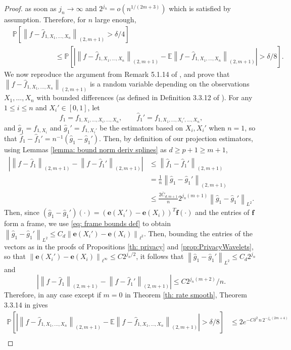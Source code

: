 \documentclass[preprint]{imsart}
\newcommand\norm[1]{\left\lVert#1\right\rVert}
\numberwithin{equation}{section}
\begin{document}
\begin{appendix}
\begin{proof}
as soon as $j_n\to \infty$ and $2^{j_n}=o\left( n^{1/(2m+3)}\right)$ which is satisfied by assumption. Therefore, for $n$ large enough,
\begin{align*}
&\mathbb{P}\left[\norm{f-\hat{f}_{1,X_1,\dots,X_n}}_{(2,m+1)}> \delta/4\right] \\
&\qquad\qquad\qquad\leq \mathbb{P}\left[\left|\norm{f-\hat{f}_{1,X_1,\dots,X_n}}_{(2,m+1)}-\mathbb{E}\norm{f-\hat{f}_{1,X_1,\dots,X_n}}_{(2,m+1)}\right|> \delta/8\right].
\end{align*}
We now reproduce the argument from Remark 5.1.14 of \cite{Gine_Nickl_2015}, and prove that $\norm{f-\hat{f}_{1,X_1,\dots,X_n}}_{(2,m+1)}$ is a random variable depending on the observations $X_1,\dots,X_n$ with bounded differences (as defined in Definition 3.3.12 of \cite{Gine_Nickl_2015}). 
For any $1\leq i\leq n$ and $X_i'\in[0,1]$, let 
\[f_1=f_{1,X_1,\dots,X_i,\dots,X_n},\qquad \hat{f}_1'=f_{1,X_1,\dots,X_i',\dots,X_n},\] and $\hat{g}_1=f_{1,X_i}$ and  $\hat{g}_1'=f_{1,X_i'}$ be the estimators based on $X_i,X_i'$ when $n=1$, so that $\hat{f}_1-\hat{f}_1'=n^{-1}\left(\hat{g}_1-\hat{g}_1'\right)$. Then, by definition of our projection estimators, using Lemmas \ref{lemma: bound norm deriv splines} as $d\geq p+1\geq m+1$,
\begin{align*}
\left|\norm{f-\hat{f}_1}_{(2,m+1)}-\norm{f-\hat{f}_1'}_{(2,m+1)}\right|&\leq \norm{\hat{f}_1-\hat{f}_1'}_{(2,m+1)}\\
&= \frac{1}{n}\norm{\hat{g}_1-\hat{g}_1'}_{(2,m+1)}\\
&\leq \frac{2\bar{C}_{d,m+1}}{n} 2^{j_n(m+1)}\norm{\hat{g}_1-\hat{g}_1'}_{L^2}.
\end{align*}
Then, since $(\hat{g}_1-\hat{g}_1')(\cdot)=\left(\mathbf{e}(X_i')-\mathbf{e}(X_i)\right)^T \mathbf{f}(\cdot)$ and the entries of $\mathbf{f}$ form a frame, we use \eqref{eq: frame bounds def} to obtain $\norm{\hat{g}_1-\hat{g}_1'}_{L^2}\leq C_d \norm{\mathbf{e}(X_i')-\mathbf{e}(X_i)}_{\ell^2}$. Then, bounding the entries of the vectors as in the proofs of Propositions \ref{th: privacy} and \ref{prop:PrivacyWavelets}, so that $\norm{\mathbf{e}(X_i')-\mathbf{e}(X_i)}_{\ell^\infty}\leq C2^{j_n/2}$, it follows that $\norm{\hat{g}_1-\hat{g}_1'}_{L^2}\leq C_d 2^{j_n}$ and
\[\left|\norm{f-\hat{f}_1}_{(2,m+1)}-\norm{f-\hat{f}_1'}_{(2,m+1)}\right|\leq C 2^{j_n(m+2)}/n.\]
Therefore, in any case except if $m=0$ in Theorem \ref{th: rate smooth}, Theorem 3.3.14 in \cite{Gine_Nickl_2015} gives
\begin{align*}
\mathbb{P}\left[\left|\norm{f-\hat{f}_{1,X_1,\dots,X_n}}_{(2,m+1)}-\mathbb{E}\norm{f-\hat{f}_{1,X_1,\dots,X_n}}_{(2,m+1)}\right|> \delta/8\right] &\leq 2e^{-C\delta^2\,n\, 2^{-j_n(2m+4)}}\nonumber\\

\end{align*}
\end{proof}
\end{appendix}
\end{document}
